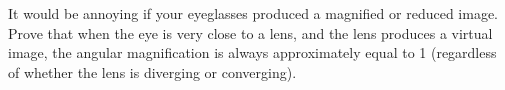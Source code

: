 It would be annoying if your eyeglasses produced a magnified or reduced image.
Prove that when the eye is very close to a lens, and the lens produces a virtual image,
the angular magnification is always approximately equal to 1 (regardless of whether the
lens is diverging or converging).
